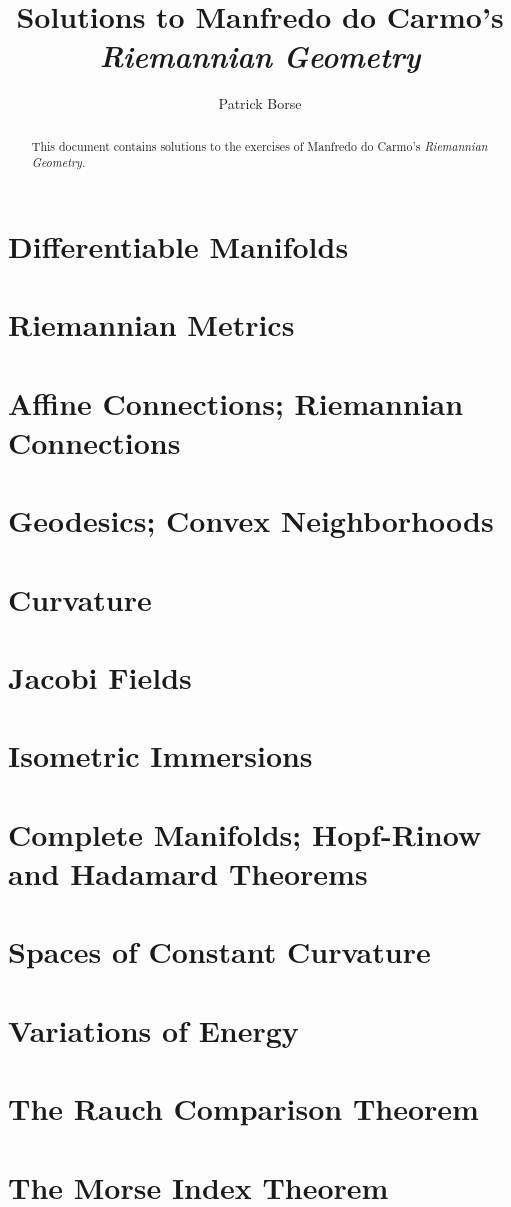\documentclass[oneside]{amsbook}
\title{Solutions to Manfredo do Carmo's\\ \emph{Riemannian Geometry}}
\author{Patrick Borse}
\numberwithin{ex}{chapter}
\begin{document}
\begin{abstract}
This document contains solutions to the exercises of Manfredo do Carmo's \emph{Riemannian Geometry}.
\end{abstract}

\maketitle

\tableofcontents

\setcounter{chapter}{-1}
\chapter{Differentiable Manifolds}


\chapter{Riemannian Metrics}


\chapter{Affine Connections; Riemannian Connections}


\chapter{Geodesics; Convex Neighborhoods}


\chapter{Curvature}


\chapter{Jacobi Fields}


\chapter{Isometric Immersions}


\chapter{Complete Manifolds; Hopf-Rinow and Hadamard Theorems}


\chapter{Spaces of Constant Curvature}


\chapter{Variations of Energy}


\chapter{The Rauch Comparison Theorem}


\chapter{The Morse Index Theorem}

\end{document}
